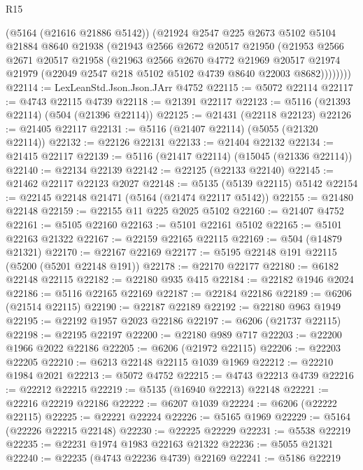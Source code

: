 \begin{lexlean}{R15}
\begin{coremodule}
{{{{{{{{{{{          (@5164 (@21616 @21886 @5142))
          (@21924
            @2547
            @225
            @2673
            @5102
            @5104
            @21884
            @8640
            @21938
            (@21943
              @2566
              @2672
              @20517
              @21950
              (@21953
                @2566
                @2671
                @20517
                @21958
                (@21963
                  @2566
                  @2670
                  @4772
                  @21969
                  @20517
                  @21974
                  @21979
                  (@22049 @2547 @218 @5102 @5102 @4739 @8640 @22003 @8682))))))))
@22114 := LexLeanStd.Json.Json.JArr @4752
@22115 := @5072 @22114
@22117 := @4743 @22115 @4739
@22118 := @21391 @22117
@22123 := @5116 (@21393 @22114) (@504 (@21396 @22114))
@22125 := @21431 (@22118 @22123)
@22126 := @21405 @22117
@22131 := @5116 (@21407 @22114) (@5055 (@21320 @22114))
@22132 := @22126 @22131
@22133 := @21404 @22132
@22134 := @21415 @22117
@22139 := @5116 (@21417 @22114) (@15045 (@21336 @22114))
@22140 := @22134 @22139
@22142 := @22125 (@22133 @22140)
@22145 := @21462 @22117 @22123 @2027
@22148 := @5135 (@5139 @22115) @5142
@22154 := @22145 @22148 @21471 (@5164 (@21474 @22117 @5142))
@22155 := @21480 @22148
@22159 := @22155 @11 @225 @2025 @5102
@22160 := @21407 @4752
@22161 := @5105 @22160
@22163 := @5101 @22161 @5102
@22165 := @5101 @22163 @21322
@22167 := @22159 @22165 @22115
@22169 := @504 (@14879 @21321)
@22170 := @22167 @22169
@22177 := @5195 @22148 @191 @22115 (@5200 (@5201 @22148 @191))
@22178 := @22170 @22177
@22180 := @6182 @22148 @22115
@22182 := @22180 @935 @415
@22184 := @22182 @1946 @2024
@22186 := @5116 @22165 @22169
@22187 := @22184 @22186
@22189 := @6206 (@21514 @22115)
@22190 := @22187 @22189
@22192 := @22180 @963 @1949
@22195 := @22192 @1957 @2023 @22186
@22197 := @6206 (@21737 @22115)
@22198 := @22195 @22197
@22200 := @22180 @989 @717
@22203 := @22200 @1966 @2022 @22186
@22205 := @6206 (@21972 @22115)
@22206 := @22203 @22205
@22210 := @6213 @22148 @22115 @1039 @1969
@22212 := @22210 @1984 @2021
@22213 := @5072 @4752
@22215 := @4743 @22213 @4739
@22216 := @22212 @22215
@22219 := @5135 (@16940 @22213) @22148
@22221 := @22216 @22219 @22186
@22222 := @6207 @1039
@22224 := @6206 (@22222 @22115)
@22225 := @22221 @22224
@22226 := @5165 @1969
@22229 := @5164 (@22226 @22215 @22148)
@22230 := @22225 @22229
@22231 := @5538 @22219
@22235 := @22231 @1974 @1983 @22163 @21322
@22236 := @5055 @21321
@22240 := @22235 (@4743 @22236 @4739) @22169
@22241 := @5186 @22219
}}}}}}}}}}}
\end{coremodule}
\end{lexlean}
